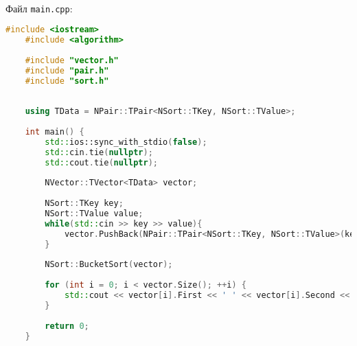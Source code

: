 \paragraph{}
Файл \texttt{main.cpp}:
\begin{lstlisting}[language=C++]
	#include <iostream>
	#include <algorithm>
	
	#include "vector.h"
	#include "pair.h"
	#include "sort.h"
	
	
	using TData = NPair::TPair<NSort::TKey, NSort::TValue>;
	
	int main() {
		std::ios::sync_with_stdio(false);
		std::cin.tie(nullptr);
		std::cout.tie(nullptr);
	
		NVector::TVector<TData> vector;
	
		NSort::TKey key;
		NSort::TValue value;
		while(std::cin >> key >> value){
			vector.PushBack(NPair::TPair<NSort::TKey, NSort::TValue>(key, value));
		}
	
		NSort::BucketSort(vector);
	
		for (int i = 0; i < vector.Size(); ++i) {
			std::cout << vector[i].First << ' ' << vector[i].Second << std::endl;
		}
	
		return 0;
	}
\end{lstlisting}


